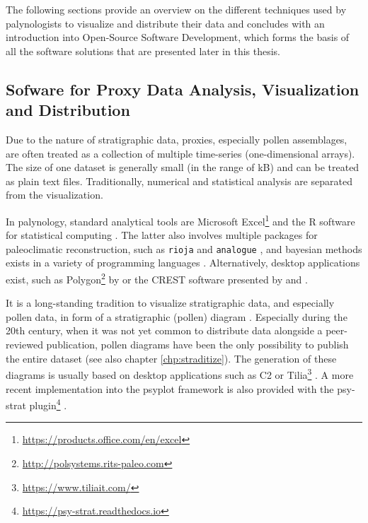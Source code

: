 \begin{refsection}
The following sections provide an overview on the different techniques used by palynologists to visualize and distribute their data and concludes with an introduction into Open-Source Software Development, which forms the basis of all the software solutions that are presented later in this thesis.

\subsection{Sofware for Proxy Data Analysis, Visualization and Distribution} \label{sec:intro-software-data}

Due to the nature of stratigraphic data, proxies, especially pollen assemblages, are often treated as a collection of multiple time-series (one-dimensional arrays). The size of one dataset is generally small (in the range of kB) and can be treated as plain text files. Traditionally, numerical and statistical analysis are separated from the visualization.

In palynology, standard analytical tools are Microsoft Excel\footnote{\url{https://products.office.com/en/excel}} and the R software for statistical computing \citep{RCT2019}. The latter also involves multiple packages for paleoclimatic reconstruction, such as \texttt{rioja} \citep{Juggins2017} and \texttt{analogue} \citep{SimpsonOksanen2019, Simpson2007}, and bayesian methods exists in a variety of programming languages \citep[e.g.][]{NolanTiptonBoothEtAl2019, Tipton2017, HaslettWhileyBhattacharyaEtAl2006,ParnellSweeneyDoanEtAl2015, HolmstroemIlvonenSeppaeEtAl2015}. Alternatively, desktop applications exist, such as Polygon\footnote{\url{http://polsystems.rits-paleo.com}} by \cite{NakagawaTarasovNishidaEtAl2002} or the CREST software presented by \cite{ChevalierCheddadiChase2014} and \cite{Chevalier2019}.

It is a long-standing tradition to visualize stratigraphic data, and especially pollen data, in form of a stratigraphic (pollen) diagram \citep{Bradley1985, Grimm1988}. Especially during the 20th century, when it was not yet common to distribute data alongside a peer-reviewed publication, pollen diagrams have been the only possibility to publish the entire dataset (see also chapter \ref{chp:straditize}). The generation of these diagrams is usually based on desktop applications such as C2 \citep{Juggins2007} or Tilia\footnote{\url{https://www.tiliait.com/}} \citep{Grimm1988, Grimm1991}. A more recent implementation into the psyplot framework \citep[chapter \ref{chp:psyplot}]{Sommer2017} is also provided with the psy-strat plugin\footnote{\url{https://psy-strat.readthedocs.io}} \citep{Sommer2019}.


\end{refsection}
